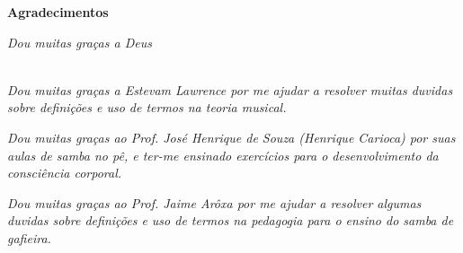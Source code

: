 \cleardoublepage

\begin{center}
\Huge{\textbf{Agradecimentos}}
\end{center}

\null
\vfill
\thispagestyle{empty}

{\normalsize \it \hfill Dou muitas graças a Deus \vspace*{4pt}}


~\\

{\normalsize \it Dou muitas graças a Estevam Lawrence por me 
ajudar a resolver muitas duvidas sobre definições e uso de termos na teoria musical.
\vspace*{4pt}}


{\normalsize \it Dou muitas graças ao Prof. José Henrique de Souza (Henrique Carioca)
por suas aulas de samba no pê, 
e ter-me ensinado exercícios para o desenvolvimento da consciência corporal.
\vspace*{4pt}}

{\normalsize \it Dou muitas graças ao Prof. Jaime Arôxa por me 
ajudar a resolver algumas duvidas sobre definições e uso de termos na pedagogia para o ensino do samba de gafieira.
\vspace*{4pt}}

\begin{comment}
{\normalsize \it Dou muitas graças a \textcolor{red}{XXXXXXXXXXX} pela 
suas sugestões e revisão  do capitulo \textcolor{red}{XXXXXXXXXXX}.
\vspace*{4pt}}
\end{comment}


